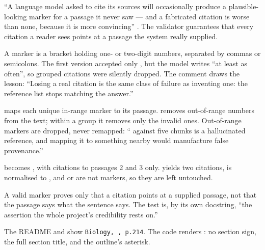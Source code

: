 ``A language model asked to cite its sources will occasionally produce a plausible-looking marker for a passage it never saw --- and a fabricated citation is worse than none, because it is more convincing'' . The validator guarantees that every citation a reader sees points at a passage the system really supplied.

A marker is a bracket holding one- or two-digit numbers, separated by commas or semicolons. The first version accepted only \code{[1]}, but the model writes \code{[1, 2]} ``at least as often'', so grouped citations were silently dropped. The comment draws the lesson: ``Losing a real citation is the same class of failure as inventing one: the reference list stops matching the answer.''

 maps each unique in-range marker to its passage.  removes out-of-range numbers from the text; within a group it removes only the invalid ones. Out-of-range markers are dropped, never remapped: ``\code{[7]} against five chunks is a hallucinated reference, and mapping it to something nearby would manufacture false provenance.''

\begin{measured}
 becomes , with citations to passages 2 and 3 only. \code{[1][2]} yields two citations, \code{[ 4 ; 5 ]} is normalised to \code{[4, 5]}, and \code{[1-3]} or \code{[100]} are not markers, so they are left untouched.
\end{measured}

A valid marker proves only that a citation points at a supplied passage, not that the passage says what the sentence says. The test  is, by its own docstring, ``the assertion the whole project's credibility rests on.''

\begin{finding}
The README and  show \texttt{Biology, , p.214}. The code renders : no section sign, the full section title, and the outline's asterisk.
\end{finding}
